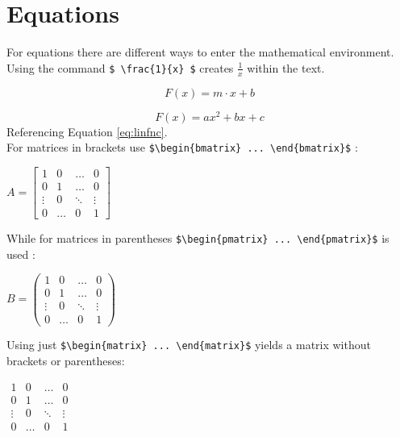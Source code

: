 \chapter{Equations}
For equations there are different ways to enter the mathematical environment. Using the command \verb+$ \frac{1}{x} $+ creates $ \frac{1}{x} $ within the text.

\begin{equation}\label{eq:linfnc}
F(x) = m \cdot x + b
\end{equation}

\begin{equation*}
F(x) = ax^{2}+bx+c
\end{equation*}
\noindent
Referencing Equation \ref{eq:linfnc}.\\
\newline
For matrices in brackets use \verb+$\begin{bmatrix} ... \end{bmatrix}$+ :
\begin{center}
$A=\begin{bmatrix}
1	& 0	& \dots	 & 0      \\
0	& 1 	& \dots  & 0 	  \\
\vdots	& 0 	& \ddots & \vdots \\
0 	& \dots & 0	 & 1
\end{bmatrix}$
\end{center}
\noindent
While for matrices in parentheses \verb+$\begin{pmatrix} ... \end{pmatrix}$+ is used :
\begin{center}
$B=\begin{pmatrix}
1	& 0	& \dots	 & 0      \\
0	& 1 	& \dots  & 0 	  \\
\vdots	& 0 	& \ddots & \vdots \\
0 	& \dots & 0	 & 1
\end{pmatrix}$
\end{center}
\noindent 
Using just \verb+$\begin{matrix} ... \end{matrix}$+ yields a matrix without brackets or parentheses:
\begin{center}
$\begin{matrix}
1	& 0	& \dots	 & 0      \\
0	& 1 	& \dots  & 0 	  \\
\vdots	& 0 	& \ddots & \vdots \\
0 	& \dots & 0	 & 1
\end{matrix}$
\end{center}